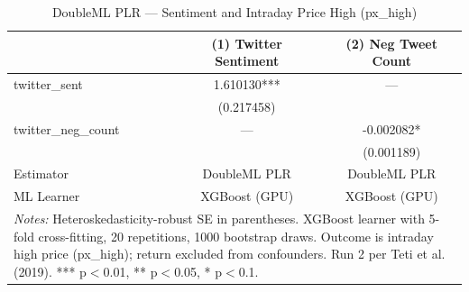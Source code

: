 \begin{table}[htbp]
\centering
\caption{DoubleML PLR --- Sentiment and Intraday Price High (px\_high)}
\begin{tabular}{lcc}
\hline\hline
 & (1) Twitter Sentiment & (2) Neg Tweet Count \\
\hline
twitter\_sent & 1.610130*** & --- \\
& (0.217458) &  \\
twitter\_neg\_count & --- & -0.002082* \\
&  & (0.001189) \\
\hline
Estimator & DoubleML PLR & DoubleML PLR \\
ML Learner & XGBoost (GPU) & XGBoost (GPU) \\
\hline\hline
\multicolumn{3}{l}{\footnotesize \textit{Notes:} Heteroskedasticity-robust SE in parentheses. XGBoost learner with 5-fold cross-fitting, 20 repetitions, 1000 bootstrap draws. Outcome is intraday high price (px\_high); return excluded from confounders. Run 2 per Teti et al. (2019). *** p$<$0.01, ** p$<$0.05, * p$<$0.1.} \\
\end{tabular}
\end{table}